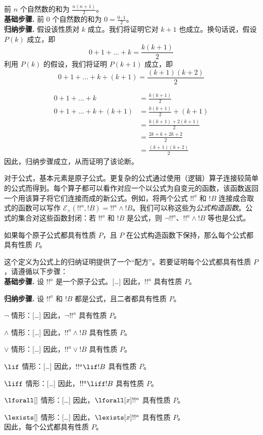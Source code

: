 \documentclass[../../include/open-logic-section]{subfiles}
\begin{document}
\begin{ex} 前 $n$ 个自然数的和为 $\frac{n(n+1)}{2}$。 \\

\textbf{基础步骤.} 前 $0$ 个自然数的和为 $0=
\frac{0\cdot 1}{2}$。\\

\textbf{归纳步骤.} 假设该性质对 $k$ 成立。我们将证明它对 $k+1$ 也成立。换句话说，假设 $P(k)$ 成立，即
\[ 0 + 1 + \ldots + k = \frac{k(k+1)}{2} \]
利用 $P(k)$ 的假设，我们将证明 $P(k+1)$ 成立，即
\[ 0 + 1 + \ldots + k + (k+1) = \frac{(k+1)(k+2)}{2} \]

\begin{align*}
0 + 1 + \ldots + k &= \frac{k(k+1)}{2} \tag{Assumption} \\
0 + 1 + \ldots + k + (k+1) &= \frac{k(k+1)}{2} + (k+1)
\tag{Add $k+1$ to both sides} \\
&= \frac{k(k+1) + 2(k+1)}{2} \\
&= \frac{2k + k + 2k +2}{2} \\
&=\frac{(k+1)(k+2)}{2}
\end{align*}
因此，归纳步骤成立，从而证明了该论断。
\end{ex}

\begin{explain}
对于公式，基本元素是原子公式。更复杂的公式通过使用（逻辑）算子连接较简单的公式而得到。每个算子都可以看作对应一个以公式为自变元的函数，该函数返回一个用该算子将它们连接而成的新公式。例如，将两个公式 $!!^a$ 和 $!B$ 连接成合取式的函数可以写作 $\mathcal E _\land (!!^a,
!B) = !!^a \land !B$。我们可以称这些为\emph{公式构造函数}。公式的集合对这些函数封闭：若 $!!^a$ 和 $!B$ 是公式，则 $\lnot !!^a$、$!!^a \land !B$ 等也是公式。
\end{explain}

\begin{defn}[公式上的归纳]
如果每个原子公式都具有性质 $P$，且 $P$ 在公式构造函数下保持，那么每个公式都具有性质 $P$。
\end{defn}

\begin{explain}
这个定义为公式上的归纳证明提供了一个“配方”。若要证明每个公式都具有性质 $P$，请遵循以下步骤：\\

\textbf{基础步骤.} 设 $!!^a$ 是一个原子公式。[\ldots] 因此，$!!^a$ 具有性质 $P$。

\textbf{归纳步骤.} 设 $!!^a$ 和 $!B$ 都是公式，且二者都具有性质 $P$。

$\lnot$ 情形：[\ldots] 因此，$\lnot !!^a$ 具有性质 $P$。

$\land$ 情形：[\ldots] 因此，$!!^a \land !B$ 具有性质 $P$。

$\lor$ 情形：[\ldots] 因此，$!!^a \lor !B$ 具有性质 $P$。

$\lif$ 情形：[\ldots] 因此，$!!^a \lif !B$ 具有性质 $P$。

$\liff$ 情形：[\ldots] 因此，$!!^a \liff !B$ 具有性质 $P$。

$\lforall[]$ 情形：[\ldots] 因此，$\lforall[x] !!^a$ 具有性质 $P$。

$\lexists[]$ 情形：[\ldots] 因此，$\lexists[x] !!^a$ 具有性质 $P$。 \\

因此，每个公式都具有性质 $P$。
\end{explain}
\end{document}
